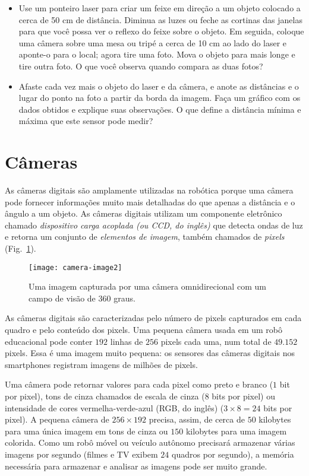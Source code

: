 \begin{framed}

\begin{itemize}
\item Use um ponteiro laser para criar um feixe em direção a um objeto colocado a cerca de 50 cm de distância. Diminua as luzes ou feche as cortinas das janelas para que você possa ver o reflexo do feixe sobre o objeto. Em seguida, coloque uma câmera sobre uma mesa ou tripé a cerca de 10 cm ao lado do laser e aponte-o para o local; agora tire uma foto. Mova o objeto para mais longe e tire outra foto. O que você observa quando compara as duas fotos?
\item Afaste cada vez mais o objeto do laser e da câmera, e anote as distâncias e o lugar do ponto na foto a partir da borda da imagem. Faça um gráfico com os dados obtidos e explique suas observações. O que define a distância mínima e máxima que este sensor pode medir?
\end{itemize}
\end{framed}

\section{Câmeras}\label{s.cameras}

As câmeras digitais são amplamente utilizadas na robótica porque uma câmera pode fornecer informações muito mais detalhadas do que apenas a distância e o ângulo a um objeto. As câmeras digitais utilizam um componente eletrônico chamado \emph{dispositivo carga acoplada (ou CCD, do inglês)} que detecta ondas de luz e retorna um conjunto de \emph{elementos de imagem}, também chamados de \emph{pixels} (Fig.~\ref{fig.camera}).

\begin{figure}
\texttt{[image: camera-image2]}
\caption{Uma imagem capturada por uma câmera omnidirecional com um campo de visão de 360 graus.}\label{fig.camera}
\end{figure}

As câmeras digitais são caracterizadas pelo número de pixels capturados em cada quadro e pelo conteúdo dos pixels. Uma pequena câmera usada em um robô educacional pode conter  $192$ linhas de $256$ pixels cada uma, num total de $49.152$ pixels. Essa é uma imagem muito pequena: os sensores das câmeras digitais nos smartphones registram imagens de milhões de pixels.

Uma câmera pode retornar valores para cada pixel como preto e branco ($1$ bit por pixel), tons de cinza chamados de escala de cinza ($8$ bits por pixel) ou intensidade de cores vermelha-verde-azul (RGB, do inglês) ($3\times 8=24$ bits por pixel). A pequena câmera de $256\times 192$ precisa, assim, de cerca de $50$ kilobytes para uma única imagem em tons de cinza ou $150$ kilobytes para uma imagem colorida. Como um robô móvel ou veículo autônomo precisará armazenar várias imagens por segundo (filmes e TV exibem $24$ quadros por segundo), a memória necessária para armazenar e analisar as imagens pode ser muito grande.

